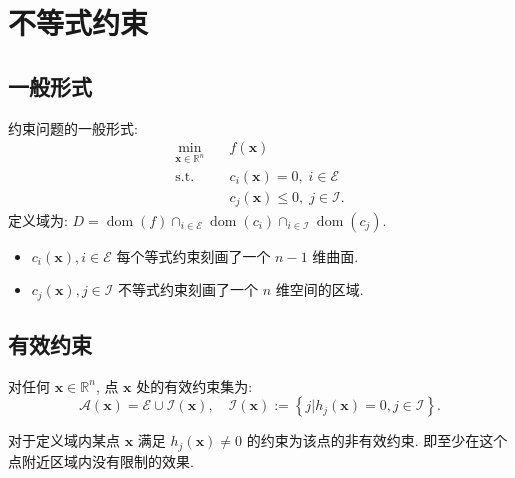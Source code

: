 \documentclass[lang = cn]{elegantpaper}
\begin{document}
\section{不等式约束}
\subsection{一般形式}
\noindent
约束问题的一般形式:
\begin{equation*}
    \begin{aligned}
        \min_{\bm{x}\in\mathbb{R}^n} \quad &f(\bm{x})\\
        \mathrm{s.t.}\quad &c_i(\bm{x})=0,\;i\in \mathcal{E} \\
        &c_j(\bm{x}) \le 0,\;j\in \mathcal{I}.
    \end{aligned}
\end{equation*}
定义域为: $D = \operatorname{dom}(f)\cap_{i \in \mathcal{E}} \operatorname{dom}(c_i)\cap_{i \in \mathcal{I}} \operatorname{dom}(c_j)$.
\begin{itemize}
    \item $c_i(\bm{x}),i \in \mathcal{E}$ 每个等式约束刻画了一个 $n-1$ 维曲面.
    \item $c_j(\bm{x}),j \in \mathcal{I}$ 不等式约束刻画了一个 $n$ 维空间的区域.
\end{itemize}
\subsection{有效约束}
\noindent
\begin{definition}
    对任何 $\bm{x} \in \mathbb{R}^n$, 点 $\bm{x}$ 处的有效约束集为:
\begin{equation*}
    \mathcal{A} (\bm{x}) = \mathcal{E} \cup \mathcal{I}(\bm{x}),\quad \mathcal{I}(\bm{x}):=\left\{j|h_j(\bm{x})=0,j\in\mathcal{I}\right\}.
\end{equation*}
\end{definition}
\noindent
对于定义域内某点 $\bm{x}$ 满足 $h_j(\bm{x}) \neq 0$ 的约束为该点的非有效约束. 即至少在这个点附近区域内没有限制的效果.
\end{document}
